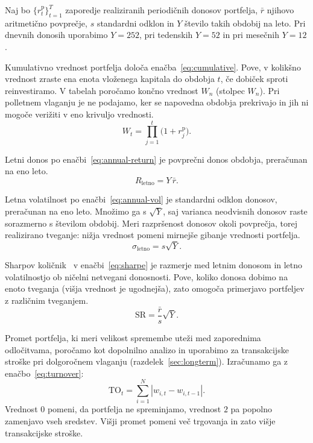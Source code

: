 \documentclass[9pt]{style/friteza}
\begin{document}
Naj bo $\{r_t^{\mathrm p}\}_{t=1}^{T}$ zaporedje realiziranih periodičnih donosov portfelja, $\bar r$ njihovo aritmetično povprečje, $s$ standardni odklon in $Y$ število takih obdobij na leto. Pri dnevnih donosih uporabimo $Y=252$, pri tedenskih $Y=52$ in pri mesečnih $Y=12$.

Kumulativno vrednost portfelja določa enačba~\eqref{eq:cumulative}. Pove, v kolikšno vrednost zraste ena enota vloženega kapitala do obdobja $t$, če dobiček sproti reinvestiramo. V tabelah poročamo končno vrednost $W_n$ (stolpec $W_n$). Pri polletnem vlaganju je ne podajamo, ker se napovedna obdobja prekrivajo in jih ni mogoče verižiti v eno krivuljo vrednosti.
\begin{equation}
\label{eq:cumulative}
W_t=\prod_{j=1}^{t}\bigl(1+r_j^{\mathrm p}\bigr).
\end{equation}

Letni donos po enačbi~\eqref{eq:annual-return} je povprečni donos obdobja, preračunan na eno leto.
\begin{equation}
\label{eq:annual-return}
R_{\mathrm{letno}}=Y\,\bar r.
\end{equation}

Letna volatilnost po enačbi~\eqref{eq:annual-vol} je standardni odklon donosov, preračunan na eno leto. Množimo ga s $\sqrt{Y}$, saj varianca neodvisnih donosov raste sorazmerno s številom obdobij. Meri razpršenost donosov okoli povprečja, torej realizirano tveganje: nižja vrednost pomeni mirnejše gibanje vrednosti portfelja.
\begin{equation}
\label{eq:annual-vol}
\sigma_{\mathrm{letno}}=s\sqrt{Y}.
\end{equation}

Sharpov količnik~\cite{sharpe1994} v enačbi~\eqref{eq:sharpe} je razmerje med letnim donosom in letno volatilnostjo ob ničelni netvegani donosnosti. Pove, koliko donosa dobimo na enoto tveganja (višja vrednost je ugodnejša), zato omogoča primerjavo portfeljev z različnim tveganjem. 
\begin{equation}
\label{eq:sharpe}
\mathrm{SR}=\frac{\bar r}{s}\sqrt{Y}.
\end{equation}

Promet portfelja, ki meri velikost spremembe uteži med zaporednima odločitvama, poročamo kot dopolnilno analizo in uporabimo za transakcijske stroške pri dolgoročnem vlaganju (razdelek~\ref{sec:longterm}). Izračunamo ga z enačbo~\eqref{eq:turnover}:
\begin{equation}
\label{eq:turnover}
\mathrm{TO}_t
=
\sum_{i=1}^{N}
\left|
w_{i,t}-w_{i,t-1}
\right|.
\end{equation}
Vrednost $0$ pomeni, da portfelja ne spreminjamo, vrednost $2$ pa popolno zamenjavo vseh sredstev. Višji promet pomeni več trgovanja in zato višje transakcijske stroške.
\end{document}
